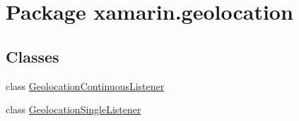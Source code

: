 \hypertarget{namespacexamarin_1_1geolocation}{\section{Package xamarin.\+geolocation}
\label{namespacexamarin_1_1geolocation}
}
\subsection*{Classes}
\begin{DoxyCompactItemize}
\item 
class \hyperlink{classxamarin_1_1geolocation_1_1_geolocation_continuous_listener}{Geolocation\+Continuous\+Listener}
\item 
class \hyperlink{classxamarin_1_1geolocation_1_1_geolocation_single_listener}{Geolocation\+Single\+Listener}
\end{DoxyCompactItemize}
